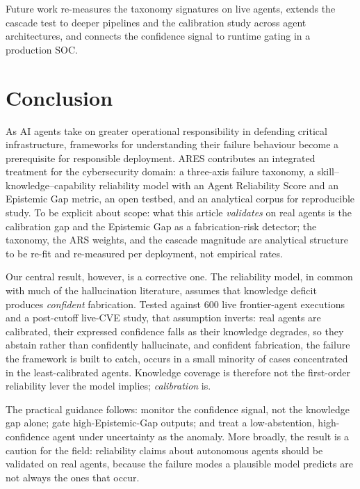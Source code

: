 \documentclass[journal,compsoc]{IEEEtran}
\newcommand{\ARES}{\textsc{ARES}}
\begin{document}
Future work re-measures the taxonomy signatures on live agents, extends
the cascade test to deeper pipelines and the calibration study across
agent architectures, and connects the confidence signal to runtime
gating in a production SOC.

\section{Conclusion}
\label{sec:conclusion}

As AI agents take on greater operational responsibility in defending
critical infrastructure, frameworks for understanding their failure
behaviour become a prerequisite for responsible deployment. \ARES{}
contributes an integrated treatment for the cybersecurity domain: a
three-axis failure taxonomy, a skill--knowledge--capability reliability
model with an Agent Reliability Score and an Epistemic Gap metric, an
open testbed, and an analytical corpus for reproducible study. To be
explicit about scope: what this article \emph{validates} on real agents
is the calibration gap and the Epistemic Gap as a fabrication-risk
detector; the taxonomy, the ARS weights, and the cascade magnitude are
analytical structure to be re-fit and re-measured per deployment, not
empirical rates.

Our central result, however, is a corrective one. The reliability
model, in common with much of the hallucination literature, assumes
that knowledge deficit produces \textit{confident} fabrication. Tested
against 600 live frontier-agent executions and a post-cutoff live-CVE
study, that assumption inverts: real agents are calibrated, their
expressed confidence falls as their knowledge degrades, so they abstain
rather than confidently hallucinate, and confident fabrication, the
failure the framework is built to catch, occurs in a small minority of
cases concentrated in the least-calibrated agents. Knowledge coverage
is therefore not the first-order reliability lever the model implies;
\textit{calibration} is.

The practical guidance follows: monitor the confidence signal, not the
knowledge gap alone; gate high-Epistemic-Gap outputs; and treat a
low-abstention, high-confidence agent under uncertainty as the anomaly.
More broadly, the result is a caution for the field: reliability claims
about autonomous agents should be validated on real agents, because the
failure modes a plausible model predicts are not always the ones that
occur.
\end{document}
